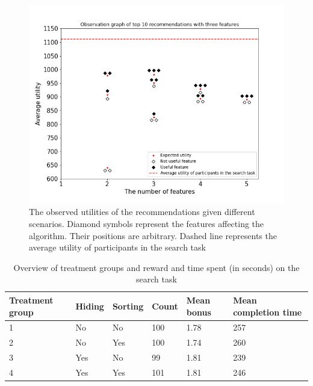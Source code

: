 \documentclass[a4paper,12pt]{article}
\begin{document}
\begin{figure}
    \centering
    \includegraphics[width=0.99\linewidth]{staticFiles/ThreeFeaturesObservedTop10SUMutility.png}
    \caption{The observed utilities of the recommendations given different scenarios. Diamond symbols represent the features affecting the algorithm. Their positions are arbitrary. Dashed line represents the average utility of participants in the search task}
    \label{fig:actualRecommendationPerformance}
\end{figure}


\begin{table}[ht]
\centering
\begin{tabular}{p{2cm}lllp{2cm}p{2.5cm}}
\hline
\textbf{Treatment group} & \textbf{Hiding} & \textbf{Sorting} & \textbf{Count} & \textbf{Mean bonus} & \textbf{Mean completion time} \\ \hline
1                        & No               & No              & 100           & 1.78               & 257                          \\
2                        & No              & Yes              & 100           & 1.74               & 260                          \\
3                        & Yes               & No             & 99           & 1.81               & 239                          \\
4                        & Yes              & Yes             & 101           & 1.81               & 246                          \\ \hline
\end{tabular}
\caption{Overview of treatment groups and reward and time spent (in seconds) on the search task}
\label{tab:rewardandcompletion}
\end{table}
\end{document}
